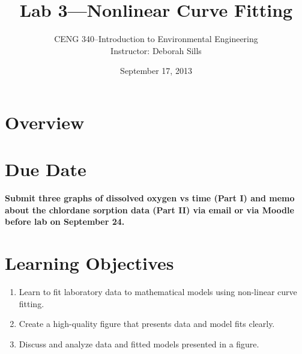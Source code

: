 \documentclass[12pt,letterpaper]{article}
\begin{document}
\setlength{\parindent}{0cm} 


\frenchspacing


\setlength{\topmargin}{-.5in}
\setlength{\textheight}{9in}
\setlength{\oddsidemargin}{.125in}
\setlength{\textwidth}{6.25in}




\title {Lab 3---Nonlinear Curve Fitting} 
\author {CENG 340--Introduction to Environmental Engineering\\
Instructor: Deborah Sills}
\date {September 17, 2013}
\maketitle


\section*{Overview}




\section *{Due Date}
\textbf{ Submit three graphs of dissolved oxygen vs time (Part I) and memo about the chlordane sorption data (Part II) via email or via Moodle before lab on September 24.} 

\section *{Learning Objectives}
\begin{enumerate}
\item Learn to fit laboratory data to mathematical models using non-linear curve fitting.\
\item Create a high-quality figure that presents data and model fits clearly.\
\item Discuss and analyze data and fitted models presented in a figure.\ 
\end{enumerate}
\end{document}
